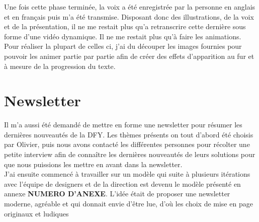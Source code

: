Une fois cette phase terminée, la voix a été enregistrée par la personne en anglais et en français puis m'a été transmise. Disposant donc des illustrations, de la voix et de la présentation, il ne me restait plus qu'a retranscrire cette dernière sous forme d'une vidéo dynamique. Il ne me restait plus qu'à faire les animations. Pour réaliser la plupart de  celles ci, j'ai du découper les images fournies pour pouvoir les animer partie par partie afin de créer des effets d'apparition au fur et à mesure de la progression du texte. 


\section{Newsletter}

Il m'a aussi été demandé de mettre en forme une newsletter pour résumer les dernières nouveautés de la DFY. Les thèmes présents on tout d'abord été choisis par Olivier, puis nous avons contacté les différentes personnes pour récolter une petite interview afin de connaître les dernières nouveautés de leurs solutions pour que nous puissions les mettre en avant dans la newsletter.\\

J'ai ensuite commencé à travailler sur un modèle qui suite à plusieurs itérations avec l'équipe de designers et de la direction est devenu le modèle présenté en annexe \textbf{NUMERO D'ANEXE}. L'idée était de proposer une newsletter moderne, agréable et qui donnait envie d'être lue, d'où les choix de mise en page originaux et ludiques



